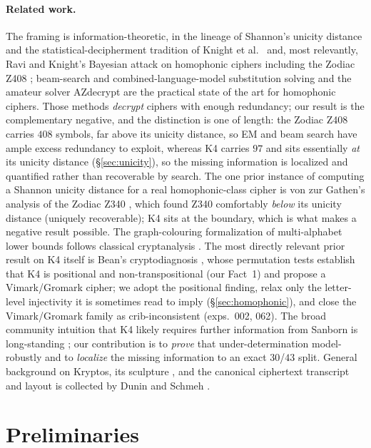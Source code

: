\documentclass[11pt]{article}
\theoremstyle{plain}
\theoremstyle{definition}
\newcommand{\K}{\textsf{K4}}
\begin{document}
\paragraph{Related work.}
The framing is information-theoretic, in the lineage of Shannon's unicity distance
\cite{shannon1949} and the statistical-decipherment tradition of Knight et
al.\ \cite{knight2006} and, most relevantly, Ravi and Knight's Bayesian attack on
homophonic ciphers including the Zodiac Z408 \cite{ravi2011}; beam-search and
combined-language-model substitution solving \cite{nuhn2013,hauer2014} and the
amateur solver AZdecrypt \cite{azdecrypt} are the practical state of the art for
homophonic ciphers. Those methods \emph{decrypt} ciphers with enough redundancy; our
result is the complementary negative, and the distinction is one of length: the
Zodiac Z408 carries $408$ symbols, far above its unicity distance, so EM and beam
search have ample excess redundancy to exploit, whereas \K{} carries $97$ and sits
essentially \emph{at} its unicity distance (\S\ref{sec:unicity}), so the missing
information is localized and quantified rather than recoverable by search. The one
prior instance of computing a Shannon unicity distance for a real homophonic-class
cipher is von zur Gathen's analysis of the Zodiac Z340 \cite{vonzurgathen2023}, which
found Z340 comfortably \emph{below} its unicity distance (uniquely recoverable); \K{}
sits at the boundary, which is what makes a negative result possible. The
graph-colouring formalization of multi-alphabet lower bounds follows classical
cryptanalysis \cite{bauer2007}. The most directly relevant prior result on \K{}
itself is Bean's cryptodiagnosis \cite{bean2021}, whose permutation tests establish
that \K{} is positional and non-transpositional (our Fact~1) and propose a
Vimark/Gromark cipher; we adopt the positional finding, relax only the letter-level
injectivity it is sometimes read to imply (\S\ref{sec:homophonic}), and close the
Vimark/Gromark family as crib-inconsistent (exps.~002, 062). The broad community
intuition that \K{} likely requires further information from Sanborn is long-standing
\cite{dunin2020}; our contribution is to \emph{prove} that under-determination
model-robustly and to \emph{localize} the missing information to an exact $30$/$43$
split. General background on Kryptos, its sculpture \cite{kryptos1990}, and the
canonical ciphertext transcript and layout \cite{elonka} is collected by Dunin and
Schmeh \cite{dunin2020}.

\section{Preliminaries}\label{sec:prelim}
\end{document}
